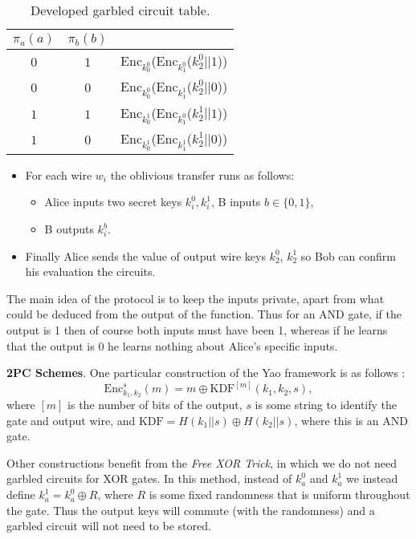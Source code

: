 \documentclass[11pt]{article}
\begin{document}
\begin{table}[ht]\centering
\begin{tabular}{c c | l}
 $\pi_a(a)$ & $\pi_b(b)$ &  \\ \hline
 $0$ & $1$ & Enc$_{k^0_0}$(Enc$_{k^0_1}$($k^0_2||1$)) \\
 $0$ & $0$ & Enc$_{k^0_0}$(Enc$_{k^1_1}$($k^0_2||0$)) \\
 $1$ & $1$ & Enc$_{k^1_0}$(Enc$_{k^0_1}$($k^1_2||1$)) \\
 $1$ & $0$ & Enc$_{k^1_0}$(Enc$_{k^1_1}$($k^1_2||0$))
\end{tabular}
\caption{Developed garbled circuit table.}
\label{table2}
\end{table}

\begin{itemize}
 \item For each wire $w_i$ the oblivious transfer runs as follows:
\begin{itemize}
 \item Alice inputs two secret keys $k_i^0,k_i^1$, B inputs $b \in \{0,1\}$,
 \item B outputs $k_i^b$.
\end{itemize}
\item Finally Alice sends the value of output wire keys $k^0_2$, $k^1_2$ so Bob can confirm his evaluation the circuits.
\end{itemize}
\noindent The main idea of the protocol is to keep the inputs private, apart from what could be deduced from the output of the function. Thus for an AND gate, if the output is 1 then of course both inputs must have been 1, whereas if he learns that the output is 0 he learns nothing about Alice's specific inputs.
\medskip

\noindent \textbf{2PC Schemes}. One particular construction of the Yao framework is as follows \cite{Lindell2008}:
\begin{equation}
\text{Enc}^s_{k_1,k_2}(m) = m \oplus \text{KDF}^{[m]}(k_1,k_2,s),
\end{equation}
where $[m]$ is the number of bits of the output, $s$ is some string to identify the gate and output wire, and $\text{KDF} = H(k_1 || s) \oplus H(k_2 || s)$, where this is an AND gate.

Other constructions benefit from the \emph{Free XOR Trick}, in which we do not need garbled circuits for XOR gates. In this method, instead of $k_a^0$ and $k_a^1$ we instead define $k_a^1 = k_a^0 \oplus R$, where $R$ is some fixed randomness that is uniform throughout the gate. Thus the output keys will commute (with the randomness) and a garbled circuit will not need to be stored.
\end{document}
